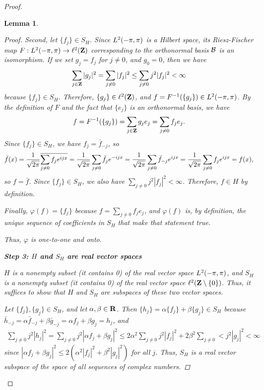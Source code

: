 \documentclass{homework}
\newtheorem{lemma}{Lemma}
\begin{document}
\begin{arabicparts}
\begin{proof}
\begin{lemma}
\begin{proof}
			Second, let $\{f_j\} \in S_H$. Since ${L^2(-\pi,\pi)}$ is a Hilbert space, its Riesz-Fischer map $F: {L^2(-\pi,\pi)} \to \ell^2(\textbf{Z})$ corresponding to the orthonormal basis $\mathcal{B}$ is an isomorphism. If we set $g_j = f_j$ for $j \ne 0$, and $g_0 = 0$, then we have
			\begin{equation}
				\sum_{j\in\textbf{Z}}|g_j|^2 = \sum_{j\ne 0}|f_j|^2 \le \sum_{j\ne 0}j^2|f_j|^2 < \infty
			\end{equation}
			because $\{f_j\} \in S_H$. Therefore, $\{g_j\} \in \ell^2(\textbf{Z})$, and $f = F^{-1}(\{g_j\}) \in {L^2(-\pi,\pi)}$. By the definition of $F$ and the fact that $\{e_j\}$ is an orthonormal basis, we have
			\begin{equation}
				f = F^{-1}(\{g_j\}) = \sum_{j\in\textbf{Z}}g_je_j = \sum_{j\ne 0}f_je_j.
			\end{equation}
			Since $\{f_j\} \in S_H$, we have $f_j = \bar{f}_{-j}$, so
			\begin{equation}
				\bar{f}(x) = \frac{1}{\sqrt{2\pi}}\overline{\sum_{j\ne0}f_je^{ijx}} = \frac{1}{\sqrt{2\pi}}\sum_{j\ne0}\bar{f}_je^{-ijx} = \frac{1}{\sqrt{2\pi}}\sum_{j\ne0}\bar{f}_{-j}e^{ijx} = \frac{1}{\sqrt{2\pi}}\sum_{j\ne0}f_je^{ijx} = f(x),
			\end{equation}
			so $f = \bar{f}$. Since $\{f_j\}\in S_H$, we also have $\sum\limits_{j\ne0}j^2|f_j|^2 < \infty$. Therefore, $f \in H$ by definition.
			
			Finally, $\varphi(f) = \{f_j\}$ because $f = \sum\limits_{j\ne 0}f_je_j$, and $\varphi(f)$ is, by definition, the unique sequence of coefficients in $S_H$ that make that statement true. 
			
			Thus, $\varphi$ is one-to-one and onto.
			
			\textbf{Step 3: $H$ and $S_H$ are real vector spaces}
			
			$H$ is a nonempty subset (it contains 0) of the real vector space ${L^2(-\pi,\pi)}$, and $S_H$ is a nonempty subset (it contains 0) of the real vector space $\ell^2(\textbf{Z} \setminus \{0\})$. Thus, it suffices to show that $H$ and $S_H$ are subspaces of these two vector spaces. 
			
			Let $\{f_j\}, \{g_j\} \in S_H$, and let $\alpha,\beta\in\textbf{R}$. Then $\{h_j\} = \alpha\{f_j\} + \beta\{g_j\} \in S_H$ because $\bar{h}_{-j} = \alpha\bar{f}_{-j} + \beta\bar{g}_{-j} = \alpha f_j + \beta g_j = h_j$, and
			\begin{align}
				\sum_{j\ne 0}j^2|h_j|^2 = \sum_{j\ne0}j^2|\alpha f_j +\beta g_j|^2 \le 2\alpha^2\sum_{j\ne0}j^2|f_j|^2 + 2\beta^2\sum_{j\ne0}< j^2|g_j|^2 < \infty
			\end{align}
			since $|\alpha f_j + \beta g_j|^2 \le 2(\alpha^2|f_j|^2 + \beta^2|g_j|^2)$ for all $j$. Thus, $S_H$ is a real vector subspace of the space of all sequences of complex numbers.
			

\end{proof}
\end{lemma}
\end{proof}
\end{arabicparts}
\end{document}
